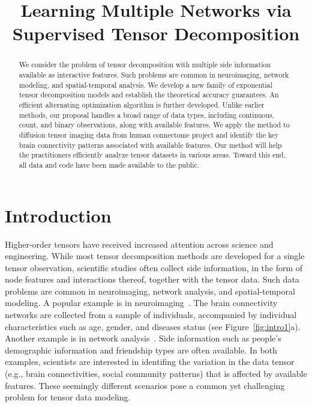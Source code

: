 \documentclass{article}
\title{Learning Multiple Networks via Supervised Tensor Decomposition}
\theoremstyle{definition}
\theoremstyle{definition}
\begin{document}
\maketitle

\begin{abstract}
We consider the problem of tensor decomposition with multiple side information available as interactive features. Such problems are common in neuroimaging, network modeling, and spatial-temporal analysis. We develop a new family of exponential tensor decomposition models and establish the theoretical accuracy guarantees. An efficient alternating optimization algorithm is further developed. Unlike earlier methods, our proposal handles a broad range of data types, including continuous, count, and binary observations, along with available features. We apply the method to diffusion tensor imaging data from human connectome project and identify the key brain connectivity patterns associated with available features. Our method will help the practitioners efficiently analyze tensor datasets in various areas. Toward this end, all data and code have been made available to the public. 
\end{abstract}

\section{Introduction}
 Higher-order tensors have received increased attention across science and engineering. While most tensor decomposition methods are developed for a single tensor observation, scientific studies often collect side information, in the form of node features and interactions thereof, together with the tensor data. Such data problems are common in neuroimaging, network analysis, and spatial-temporal modeling. A popular example is in neuroimaging~\citep{zhou2013tensor}. The brain connectivity networks are collected from a sample of individuals, accompanied by individual characteristics such as age, gender, and diseases status (see Figure~\ref{fig:intro1}a). Another example is in network analysis~\citep{pmlr-v108-berthet20a}. Side information such as people’s demographic information and friendship types are often available. In both examples, scientists are interested in identifing the variation in the data tensor (e.g., brain connectivities, social community patterns) that is affected by available features. These seemingly different scenarios pose a common yet challenging problem for tensor data modeling. 
 
\end{document}
